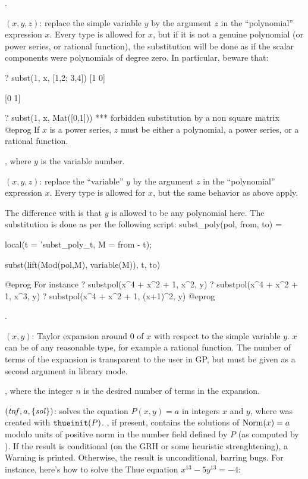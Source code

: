 .

$(x,y,z)$:
replace the simple variable $y$ by the argument $z$ in the ``polynomial''
expression $x$. Every type is allowed for $x$, but if it is not a genuine
polynomial (or power series, or rational function), the substitution will be
done as if the scalar components were polynomials of degree zero. In
particular, beware that:

\bprog
? subst(1, x, [1,2; 3,4])
[1 0]

[0 1]

? subst(1, x, Mat([0,1]))
  ***   forbidden substitution by a non square matrix
@eprog
\noindent If $x$ is a power series, $z$ must be either a polynomial, a power
series, or a rational function.

, where $y$ is the variable number.

$(x,y,z)$:
replace the ``variable'' $y$ by the argument $z$ in the ``polynomial''
expression $x$. Every type is allowed for $x$, but the same behavior
as  above apply.

The difference with  is that $y$ is allowed to be any polynomial
here. The substitution is done as per the following script:
\bprog
   subst_poly(pol, from, to) =
   { local(t = 'subst_poly_t, M = from - t);

     subst(lift(Mod(pol,M), variable(M)), t, to)
   }
@eprog
\noindent For instance
\bprog
? substpol(x^4 + x^2 + 1, x^2, y)
? substpol(x^4 + x^2 + 1, x^3, y)
? substpol(x^4 + x^2 + 1, (x+1)^2, y)
@eprog

.

$(x,y)$: Taylor expansion around $0$ of $x$ with respect
to\label{se:taylor}
the simple variable $y$. $x$ can be of any reasonable type, for example a
rational function. The number of terms of the expansion is transparent to the
user in GP, but must be given as a second argument in library mode.

, where the  integer $n$ is the desired number of
terms in the expansion.

$(\hbox{\it tnf\/},a,\{\hbox{\it sol\/}\})$: solves the equation
$P(x,y)=a$ in integers $x$ and $y$, where  was created with
${\tt thueinit}(P)$. , if present, contains the solutions of
${\rm Norm}(x)=a$ modulo units of positive norm in the number field
defined by $P$ (as computed by ). If the
result is conditional (on the GRH or some heuristic strenghtening),
a Warning is printed. Otherwise, the result is unconditional, barring bugs.
For instance, here's how to solve the Thue equation $x^{13} - 5y^{13} = - 4$:

